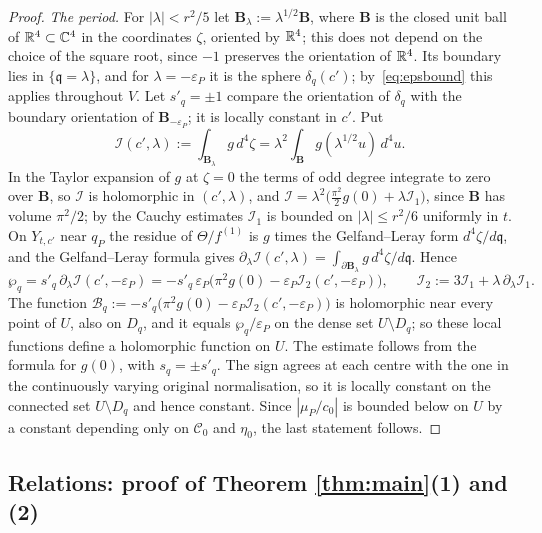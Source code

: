\begin{proof}
\emph{The period.} For $|\lambda|<r^2/5$ let $\mathbf B_\lambda:=\lambda^{1/2}\mathbf B$, where $\mathbf B$ is the closed
unit ball of $\mathbb R^4\subset\mathbb C^4$ in the coordinates $\zeta$, oriented by $\mathbb R^4$; this does not depend on the choice of the
square root, since $-1$ preserves the orientation of $\mathbb R^4$. Its boundary lies in $\{\mathfrak q=\lambda\}$, and for
$\lambda=-\varepsilon_P$ it is the sphere $\delta_q(c')$; by~\eqref{eq:epsbound} this applies throughout $V$. Let
$s'_q=\pm1$ compare the orientation of $\delta_q$ with the boundary orientation of $\mathbf B_{-\varepsilon_P}$; it is
locally constant in $c'$. Put
\[
\mathcal I(c',\lambda):=\int_{\mathbf B_\lambda}g\,d^4\zeta=\lambda^2\int_{\mathbf B}g(\lambda^{1/2}u)\,d^4u .
\]
In the Taylor expansion of $g$ at $\zeta=0$ the terms of odd degree integrate to zero over $\mathbf B$, so $\mathcal I$
is holomorphic in $(c',\lambda)$, and $\mathcal I=\lambda^2\bigl(\tfrac{\pi^2}2g(0)+\lambda\mathcal I_1\bigr)$, since
$\mathbf B$ has volume $\pi^2/2$; by the Cauchy estimates $\mathcal I_1$ is bounded on $|\lambda|\le r^2/6$ uniformly in
$t$. On $Y_{t,c'}$ near $q_P$ the residue of $\Theta/f^{(1)}$ is $g$ times the Gelfand--Leray form $d^4\zeta/d\mathfrak q$,
and the Gelfand--Leray formula \cite[\S\S7.1, 10.2]{AGZV2} gives
$\partial_\lambda\mathcal I(c',\lambda)=\int_{\partial\mathbf B_\lambda}g\,d^4\zeta/d\mathfrak q$. Hence
\[
\wp_q=s'_q\,\partial_\lambda\mathcal I(c',-\varepsilon_P)
=-s'_q\,\varepsilon_P\bigl(\pi^2g(0)-\varepsilon_P\mathcal I_2(c',-\varepsilon_P)\bigr),\qquad
\mathcal I_2:=3\mathcal I_1+\lambda\,\partial_\lambda\mathcal I_1 .
\]
The function $\mathcal B_q:=-s'_q\bigl(\pi^2g(0)-\varepsilon_P\mathcal I_2(c',-\varepsilon_P)\bigr)$ is holomorphic near every
point of $U$, also on $D_q$, and it equals $\wp_q/\varepsilon_P$ on the dense set $U\setminus D_q$; so these local
functions define a holomorphic function on $U$. The estimate follows from the formula for $g(0)$, with
$s_q=\pm s'_q$. The sign agrees at each centre with the one in the continuously varying original normalisation,
so it is locally constant on the connected set $U\setminus D_q$ and hence constant.
Since $|\mu_P/c_0|$ is bounded below on $U$ by a constant depending only on $\mathscr C_0$ and $\eta_0$, the last
statement follows.
\end{proof}

\subsection{Relations: proof of Theorem \texorpdfstring{\ref{thm:main}}{A}(1) and (2)}\label{ssec:relations}

